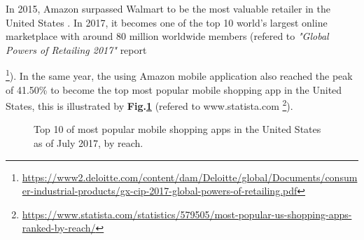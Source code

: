 In 2015, Amazon surpassed Walmart to be the most valuable retailer in the United States \cite{kantor2015inside}. In 2017, it becomes one of the top 10 world's largest online marketplace with around 80 million worldwide members (refered to \textit{"Global Powers of Retailing 2017"} report {\footnote{\url{https://www2.deloitte.com/content/dam/Deloitte/global/Documents/consumer-industrial-products/gx-cip-2017-global-powers-of-retailing.pdf}}). In the same year, the using Amazon mobile application also reached the peak of 41.50\% to become the top most popular mobile shopping app in the United States, this is illustrated by \textbf{Fig.\ref{fig:statistic}} (refered to www.statista.com {\footnote{\url{https://www.statista.com/statistics/579505/most-popular-us-shopping-apps-ranked-by-reach/}}}). 
\begin{figure}[!h]
	\begin{center}
	\end{center}
	\caption{\label{fig:statistic} Top 10 of most popular mobile shopping apps in the United States as of July 2017, by reach.}
\end{figure}

}

